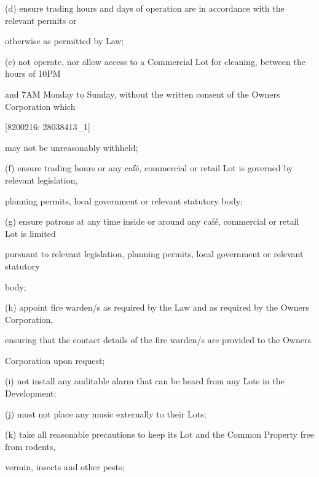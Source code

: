 \documentclass{article}
\begin{document}
{\fontsize{9.962}{1}(d) ensure trading hours and days of operation are in accordance with the relevant permits or }

{\fontsize{10.02}{1}otherwise as permitted by Law; }

{\fontsize{9.962}{1}(e) not operate, nor allow access to a Commercial Lot for cleaning, between the hours of 10PM }

{\fontsize{10.02}{1}and 7AM Monday to Sunday, without the written consent of the Owners Corporation which }

\newpage
















{\fontsize{7.02}{1}[8200216: 28038413\_1] }

{\fontsize{10.02}{1}may not be unreasonably withheld; }

{\fontsize{9.962}{1}(f) ensure trading hours or any café, commercial or retail Lot is governed by relevant legislation, }

{\fontsize{10.02}{1}planning permits, local government or relevant statutory body; }

{\fontsize{9.962}{1}(g) ensure patrons at any time inside or around any café, commercial or retail Lot is limited }

{\fontsize{10.02}{1}pursuant to relevant legislation, planning permits, local government or relevant statutory }

{\fontsize{10.02}{1}body; }

{\fontsize{9.962}{1}(h) appoint fire warden/s as required by the Law and as required by the Owners Corporation, }

{\fontsize{10.02}{1}ensuring that the contact details of the fire warden/s are provided to the Owners }

{\fontsize{10.02}{1}Corporation upon request; }

{\fontsize{9.962}{1}(i) not install any auditable alarm that can be heard from any Lots in the Development; }

{\fontsize{9.962}{1}(j) must not place any music externally to their Lots; }

{\fontsize{9.962}{1}(k) take all reasonable precautions to keep its Lot and the Common Property free from rodents, }

{\fontsize{10.02}{1}vermin, insects and other pests; }
\end{document}
